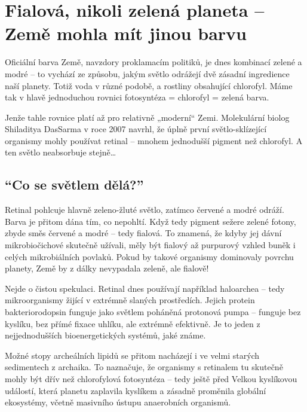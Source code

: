 \documentclass[main.tex]{subfiles}
\begin{document}
\section{Fialová, nikoli zelená planeta – Země mohla mít jinou barvu}
Oficiální barva Země, navzdory proklamacím politiků, je dnes kombinací zelené a modré – to vychází ze způsobu, jakým světlo odrážejí dvě zásadní ingredience naší planety. Totiž voda v různé podobě, a rostliny obsahující chlorofyl. Máme tak v hlavě jednoduchou rovnici fotosyntéza = chlorofyl = zelená barva.\par
Jenže tahle rovnice platí až pro relativně „moderní“ Zemi. Molekulární biolog Shiladitya DasSarma v roce 2007 navrhl, že úplně první světlo-sklízející organismy mohly používat retinal – mnohem jednodušší pigment než chlorofyl. A ten světlo neabsorbuje stejně…
\subsection*{\enquote{Co se světlem dělá?}}
Retinal pohlcuje hlavně zeleno-žluté světlo, zatímco červené a modré odráží. Barva je přitom dána tím, co nepohltí. Když tedy pigment sežere zelené fotony, zbyde směs červené a modré – tedy fialová. To znamená, že kdyby jej dávní mikrobiočichové skutečně užívali, měly být fialový až purpurový vzhled buněk i celých mikrobiálních povlaků. Pokud by takové organismy dominovaly povrchu planety, Země by z dálky nevypadala zeleně, ale fialově!\par
Nejde o čistou spekulaci. Retinal dnes používají například haloarchea – tedy mikroorganismy žijící v extrémně slaných prostředích. Jejich protein bakteriorodopsin funguje jako světlem poháněná protonová pumpa – funguje bez kyslíku, bez přímé fixace uhlíku, ale extrémně efektivně. Je to jeden z nejjednodušších bioenergetických systémů, jaké známe.\par
Možné stopy archeálních lipidů se přitom nacházejí i ve velmi starých sedimentech z archaika. To naznačuje, že organismy s retinalem tu skutečně mohly být dřív než chlorofylová fotosyntéza – tedy ještě před Velkou kyslíkovou událostí, která planetu zaplavila kyslíkem a zásadně proměnila globální ekosystémy, včetně masivního ústupu anaerobních organismů.
\end{document}
